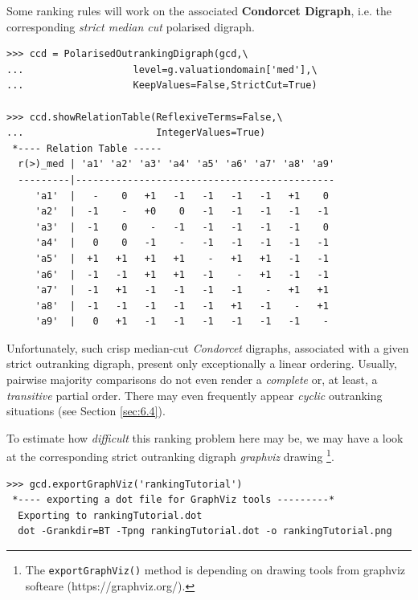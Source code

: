 Some ranking rules will work on the associated \textbf{Condorcet Digraph}, i.e. the corresponding \emph{strict median cut} polarised digraph.
 
\begin{lstlisting}[caption={Median cut polarised strict outranking relation characteristics},label=list:8.2]
>>> ccd = PolarisedOutrankingDigraph(gcd,\
...                   level=g.valuationdomain['med'],\
...                   KeepValues=False,StrictCut=True)

>>> ccd.showRelationTable(ReflexiveTerms=False,\
...                       IntegerValues=True)
 *---- Relation Table -----
  r(>)_med | 'a1' 'a2' 'a3' 'a4' 'a5' 'a6' 'a7' 'a8' 'a9'   
  ---------|---------------------------------------------
     'a1'  |   -    0   +1   -1   -1   -1   -1   +1    0  
     'a2'  |  -1    -   +0    0   -1   -1   -1   -1   -1  
     'a3'  |  -1    0    -   -1   -1   -1   -1   -1    0  
     'a4'  |   0    0   -1    -   -1   -1   -1   -1   -1  
     'a5'  |  +1   +1   +1   +1    -   +1   +1   -1   -1  
     'a6'  |  -1   -1   +1   +1   -1    -   +1   -1   -1  
     'a7'  |  -1   +1   -1   -1   -1   -1    -   +1   +1  
     'a8'  |  -1   -1   -1   -1   -1   +1   -1    -   +1  
     'a9'  |   0   +1   -1   -1   -1   -1   -1   -1    -   
\end{lstlisting}

Unfortunately, such crisp median-cut \emph{Condorcet} digraphs, associated with a given strict outranking digraph, present only exceptionally a linear ordering. Usually, pairwise majority comparisons do not even render a \emph{complete} or, at least, a \emph{transitive} partial order. There may even frequently appear \emph{cyclic} outranking situations (see Section \ref{sec:6.4}).

To estimate how \emph{difficult} this ranking problem here may be, we may have a look at the corresponding strict outranking digraph \emph{graphviz} drawing \footnote{ The \texttt{exportGraphViz()} method is depending on drawing tools from graphviz softeare (https://graphviz.org/).}.

\begin{lstlisting}
>>> gcd.exportGraphViz('rankingTutorial')
 *---- exporting a dot file for GraphViz tools ---------*
  Exporting to rankingTutorial.dot
  dot -Grankdir=BT -Tpng rankingTutorial.dot -o rankingTutorial.png
\end{lstlisting}

